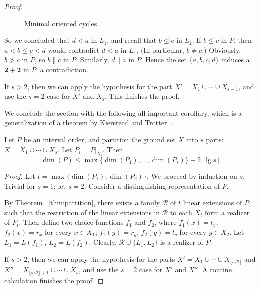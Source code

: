 \begin{proof}
\begin{figure}
\caption{Minimal oriented cycles}\label{fig:cycles}
\end{figure}

So we concluded that $d<a$ in $L_1$, and recall that $b\leq c$ in $L_2$. If $b\leq c$ in $P$, then $a<b\leq c<d$ would contradict $d<a$ in $L_1$. (In particular, $b\neq c$.) Obviously, $b\not>c$ in $P$, so $b\|c$ in $P$. Similarly, $d\| a$ in $P$. Hence the set $\{a,b,c,d\}$ induces a $\mathbf{2}+\mathbf{2}$ in $P$, a contradiction.

If $s>2$, then we can apply the hypothesis for the part $X'=X_1\cup\cdots\cup X_{s-1}$, and use the $s=2$ case for $X'$ and $X_s$. This finishes the proof.
\end{proof}

We conclude the section with the following all-important corollary, which is a generalization of a theorem by Kierstead and Trotter~\cite{KT-00}.

\begin{theorem}\label{thm:maxplus2}
Let $P$ be an interval order, and partition the ground set $X$ into $s$ parts: $X=X_1\cup\cdots\cup X_s$. Let $P_i=P|_{X_i}$. Then
\[
\dim(P)\leq \max\{\dim(P_1),\ldots,\dim(P_s)\}+2\lceil \lg s\rceil
\]
\end{theorem}

\begin{proof}
Let $t=\max\{\dim(P_1),\dim(P_2)\}$. We proceed
by induction on $s$. Trivial for $s=1$; let $s=2$. Consider a distinguishing representation of $P$.

By Theorem ~\ref{thm:partition}, there exists a family $\mathcal{R}$ of $t$ linear extensions of $P$, such that the restriction of the linear extensions in $\mathcal{R}$ to each $X_i$ form a realizer of $P_i$. Then define two choice functions $f_1$ and $f_2$, where $f_1(x)=l_x$, $f_2(x)=r_x$ for every $x \in X_1$; $f_1(y)=r_y$, $f_2(y)=l_y$ for every $y \in X_2$. Let $L_1=L(f_1)$, $L_2=L(f_2)$. Clearly, $\mathcal{R} \cup \{L_1, L_2\}$ is a realizer of $P$.

If $s>2$, then we can apply the hypothesis for the parts $X'=X_1\cup\cdots\cup X_{\lfloor s/2\rfloor}$ and $X''=X_{\lfloor s/2\rfloor+1}\cup\cdots\cup X_s$, and use the $s=2$ case for $X'$ and $X''$. A routine calculation finishes the proof.
\end{proof}
